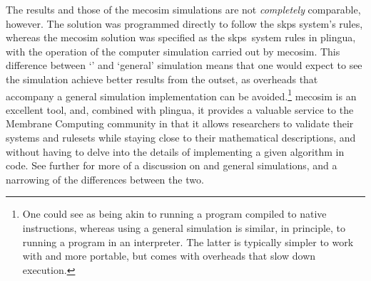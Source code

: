 The \fsharp{} results and those of the \gls{mecosim} simulations are not \emph{completely} comparable, however.  The \fsharp{} solution was programmed directly to follow the \gls{skps} system's rules, whereas the \gls{mecosim} solution was specified as the \gls{skps}~system rules in \gls{plingua}, with the operation of the computer simulation carried out by \gls{mecosim}.  This difference between `\adhoc{}' and `general' simulation means that one would expect to see the \fsharp{} simulation achieve better results from the outset, as overheads that accompany a general simulation implementation can be avoided.\footnote{One could see \adhoc{} as being akin to running a program compiled to native instructions, whereas using a general simulation is similar, in principle, to running a program in an interpreter.  The latter is typically simpler to work with and more portable, but comes with overheads that slow down execution.}  \Gls{mecosim} is an excellent tool, and, combined with \gls{plingua}, it provides a valuable service to the Membrane Computing community in that it allows researchers to validate their systems and \glspl{ruleset} while staying close to their mathematical descriptions, and without having to delve into the details of implementing a given algorithm in code.  See further \cite{Perez-Hurtado2019} for more of a discussion on \adhoc{} and general simulations, and a narrowing of the differences between the two.